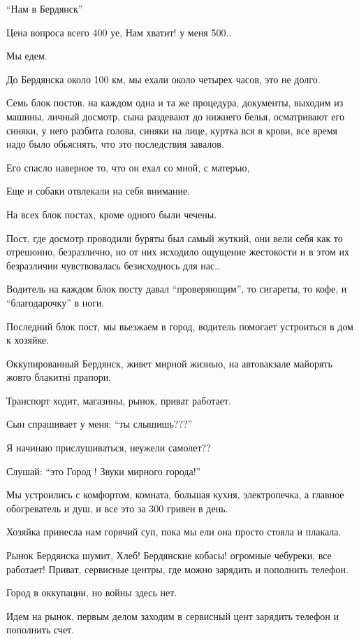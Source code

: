 \enquote{Нам в Бердянск}

Цена вопроса всего 400 уе,  Нам хватит! у меня 500..

Мы едем.

До Бердянска около 100 км, мы ехали около четырех часов, это не долго.

Семь блок постов. на  каждом одна и та же процедура, документы, выходим из
машины, личный досмотр, сына раздевают до нижнего  белья, осматривают его
синяки, у него разбита голова,  синяки на лице, куртка вся в крови, все время
надо было обьяснять, что это последствия  завалов.

Его спасло наверное то, что он ехал со мной, с матерью, 

Еще и собаки отвлекали на себя внимание.

На всех блок постах, кроме одного были чечены.

Пост, где досмотр проводили буряты был самый жуткий, они вели себя как то
отрешонно, безразлично, но от них исходило ощущение жестокости и в этом их
безразличии чувствовалась безисходнось для нас..

Водитель на каждом блок посту давал \enquote{проверяющим}, то сигареты, то кофе, и
\enquote{благодарочку} в ноги.

Последний блок пост, мы вьезжаем в город,  водитель  помогает устроиться в дом
к хозяйке.

Оккупированный Бердянск, живет мирной жизнью, на автовакзале майорять жовто
блакитні прапори.

Транспорт ходит, магазины,  рынок, приват работает.

Сын спрашивает у меня: \enquote{ты слышишь???}

Я начинаю прислушиваться, неужели самолет?? 

Слушай: \enquote{это Город ! Звуки мирного города!}

Мы устроились с комфортом, комната, большая кухня, электропечка, а главное
обогреватель и душ, и все это за 300 гривен в день.

Хозяйка принесла нам горячий суп, пока мы ели она просто стояла и плакала.

Рынок Бердянска шумит, Хлеб! Бердянские кобасы! огромные чебуреки, все
работает! Приват, сервисные центры, где можно зарядить и пополнить телефон.

Город в оккупации, но войны здесь нет.

Идем на рынок, первым делом заходим в сервисный цент зарядить  телефон и
пополнить счет.

